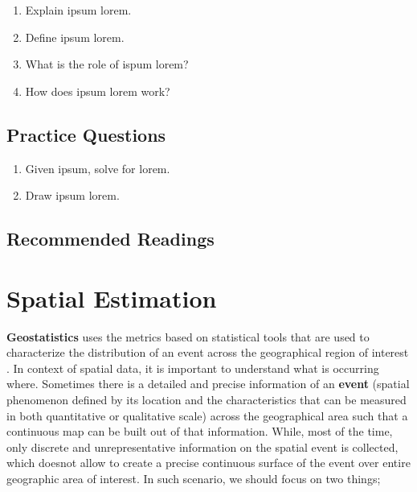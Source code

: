 \documentclass[
]{book}
\providecommand{\tightlist}{%
  \setlength{\itemsep}{0pt}\setlength{\parskip}{0pt}}
\begin{document}
\begin{enumerate}
\def\labelenumi{\arabic{enumi}.}
\tightlist
\item
  Explain ipsum lorem.
\item
  Define ipsum lorem.
\item
  What is the role of ispum lorem?
\item
  How does ipsum lorem work?
\end{enumerate}

\hypertarget{practice-questions-6}{%
\section*{Practice Questions}\label{practice-questions-6}}

\begin{enumerate}
\def\labelenumi{\arabic{enumi}.}
\setcounter{enumi}{1}
\tightlist
\item
  Given ipsum, solve for lorem.
\item
  Draw ipsum lorem.
\end{enumerate}

\hypertarget{recommended-readings-3}{%
\section*{Recommended Readings}\label{recommended-readings-3}}

\hypertarget{spatial-estimation}{%
\chapter{Spatial Estimation}\label{spatial-estimation}}

\textbf{Geostatistics} uses the metrics based on statistical tools that are used to characterize the distribution of an event across the geographical region of interest \citep{getis_spatial_2004}. In context of spatial data, it is important to understand what is occurring where. Sometimes there is a detailed and precise information of an \textbf{event} (spatial phenomenon defined by its location and the characteristics that can be measured in both quantitative or qualitative scale) across the geographical area such that a continuous map can be built out of that information. While, most of the time, only discrete and unrepresentative information on the spatial event is collected, which doesnot allow to create a precise continuous surface of the event over entire geographic area of interest. In such scenario, we should focus on two things;
\end{document}
